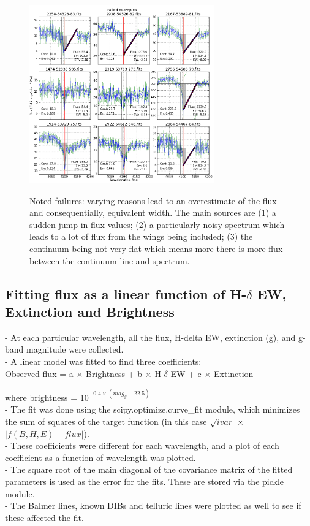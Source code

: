 \documentclass[preprint]{aastex}
\begin{document}
\begin{figure}
\includegraphics[width=8cm]{failb_labeled}\\
\caption{Noted failures: varying reasons lead to an overestimate of the flux and consequentially, equivalent width. The main sources are (1) a sudden jump in flux values; (2) a particularly noisy spectrum which leads to a lot of flux from the wings being included; (3) the continuum being not very flat which means more there is more flux between the continuum line and spectrum.}
\end{figure}

\subsection{Fitting flux as a linear function of H-$\delta$ EW, Extinction and Brightness}
- At each particular wavelength, all the flux, H-delta EW, extinction (g), and g-band magnitude were collected. \\
- A linear model was fitted to find three coefficients:\\
Observed flux = a $\times$ Brightness + b $\times$ H-$\delta$  EW + c $\times$ Extinction

 where brightness = 10$^{-0.4 \times (mag_g - 22.5)}$\\
- The fit was done using the scipy.optimize.curve\_fit module, which minimizes the sum of squares of the target function (in this case $\sqrt{ivar}$ $\times$ $|f(B,H,E)-flux|$).
\\
- These coefficients were different for each wavelength, and a plot of each coefficient as a function of wavelength was plotted.\\
- The square root of the main diagonal of the covariance matrix of the fitted parameters is used as the error for the fits. These are stored via the pickle module.\\
- The Balmer lines, known DIBs and telluric lines were plotted as well to see if these affected the fit.
\end{document}
